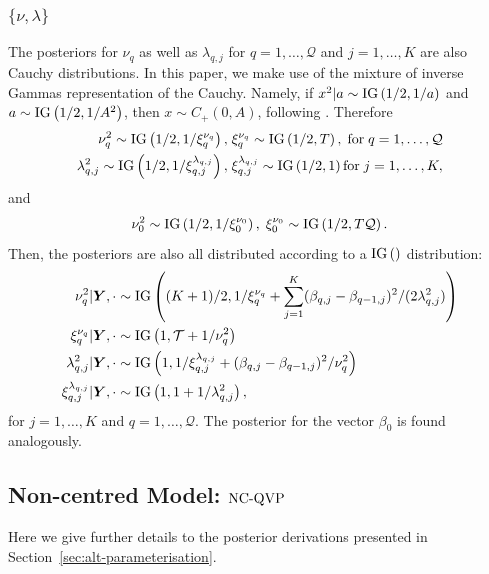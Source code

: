 \subsubsection{$\{\nu,\lambda\}$}
%
The posteriors for $\nu_q$ as well as $\lambda_{q,j}$ for $q=1,\dotsc,\mathcal{Q}$ and $j = 1,\dotsc,K$ are also Cauchy distributions. In this paper, we make use of the mixture of inverse Gammas representation of the Cauchy. Namely, if $x^2\vert a \sim \text{\normalfont IG}\left(1/2,1/a\right)$ and $a \sim \text{\normalfont IG}\left(1/2,1/A^2\right)$, then $x \sim C_+(0,A)$,  following \citet{makalic2015simple}. Therefore
%
\begin{equation}
\begin{split}
    \nu^2_q \sim \text{\normalfont IG}\left(1/2,1/\xi^{\nu_q}_{q}\right),\; & \xi^{\nu_q}_{q} \sim \text{\normalfont IG}\left(1/2,T\right), \; \mathrm{for} \; q = 1,\dotsc,\mathcal{Q} \\
    \lambda^{2}_{q,j} \sim \text{\normalfont IG}\left(1/2,1/\xi_{q,j}^{\lambda_{q,j}}\right),\; &  \xi_{q,j}^{\lambda_{q,j}} \sim \text{\normalfont IG}\left(1/2,1\right) \mathrm{for} \; j = 1,\dotsc,K,
 \end{split}
\end{equation}
%
and
%
\begin{equation}
    \nu^2_0 \sim \text{\normalfont IG}\left(1/2,1/\xi^{\nu_0}_{0}\right),\; \xi^{\nu_0}_{0} \sim \text{\normalfont IG}\left(1/2,T\mathcal{Q}\right).
\end{equation}
%
Then, the posteriors are also all distributed according to a $\text{\normalfont IG}\left(\right)$ distribution: 
%
\begin{equation}
\begin{split}
    \nu^2_q \vert \boldsymbol{Y},\cdot & \sim \text{\normalfont IG}\left((K+1)/2,1/\xi^{\nu_q}_{q} + \sum_{j=1}^K (\beta_{q,j} - \beta_{q-1,j})^2/(2 \lambda^2_{q,j}) \right) \\
    \xi^{\nu_q}_{q} \vert \boldsymbol{Y},\cdot & \sim \text{\normalfont IG}\left(1,\mathcal{T} + 1/\nu^2_q\right) \\ 
    \lambda^{2}_{q,j} \vert \boldsymbol{Y},\cdot & \sim \text{\normalfont IG}\left(1,1/\xi_{q,j}^{\lambda_{q,j}} + (\beta_{q,j} - \beta_{q-1,j})^2/\nu^2_q\right) \\
    \xi_{q,j}^{\lambda_{q,j}} \vert \boldsymbol{Y}, \cdot & \sim \text{\normalfont IG}\left(1, 1 + 1/\lambda^2_{q,j}\right),
 \end{split}
\end{equation}
%
for $j=1,\dotsc,K$ and $q = 1,\dotsc,\mathcal{Q}$. The posterior for the vector $\beta_0$ is found analogously. 
\subsection{Non-centred Model: $\operatorname{NC-QVP}$}
Here we give further details to the posterior derivations presented in Section~\ref{sec:alt-parameterisation}.
% 
